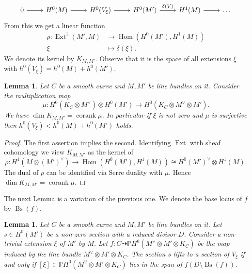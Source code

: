 \documentclass[12pt]{extarticle}
\newtheorem{lemma}[theorem]{Lemma}
\theoremstyle{definition}
\numberwithin{theorem}{section}
\newcommand{\PP}{\mathbb{P}}
\newcommand{\op}{\operatorname}
\begin{document}
\begin{equation*}
\begin{tikzcd}
	0 & {H^0(M)} & {H^0(V_\xi)} & {H^0(M')} & {H^1(M)} & \ldots
	\arrow[from=1-1, to=1-2]
	\arrow[from=1-2, to=1-3]
	\arrow[from=1-3, to=1-4]
	\arrow["{\delta(V)}", from=1-4, to=1-5]
	\arrow[from=1-5, to=1-6]
\end{tikzcd}
\end{equation*}
From this we get a linear function
\begin{align}
\label{eq:boundary_map}
\rho: \op{Ext}^1(M',M) &\rightarrow \op{Hom}(H^0(M'),H^1(M))\\
\xi &\mapsto \delta(\xi).
\end{align}
We denote its kernel by $K_{M,M'}$. Observe that it is the space of all extensions $\xi$ with $h^0(V_\xi) = h^0(M) + h^0(M')$. 
\begin{lemma}\label{lemma:ext}
Let $C$ be a smooth curve and $M, M' $ be line bundles on it. Consider the multiplication map 
\begin{equation*}
\mu: H^0(K_C \otimes M^\vee) \otimes H^0(M') \rightarrow H^0(K_C \otimes M^\vee \otimes M').
\end{equation*}
We have $\dim K_{M,M'} = \op{corank} \mu$. In particular if $\xi$ is not zero and $\mu$ is surjective then $h^0(V_\xi) < h^0(M) + h^0(M')$ holds. 
\end{lemma}
\begin{proof}
The first assertion implies the second. Identifying $\op{Ext}$ with sheaf cohomology we view $K_{M,M'}$ as the kernel of   
\begin{equation*}
\rho : H^1(M \otimes (M')^\vee) \rightarrow \op{Hom}(H^0(M'), H^1(M)) \cong H^0(M')^\vee \otimes H^1(M).
\end{equation*}
The dual of $\rho$ can be identified via Serre duality with $\mu$. Hence $\dim K_{M,M'} = \op{corank} \mu$.
\end{proof}
The next Lemma is a variation of the previous one. We denote the base locus of $f$ by $\op{Bs}(f)$.
\begin{lemma}\label{lemma:lift_section}
Let $C$ be a smooth curve and $M, M' $ be line bundles on it. Let $s \in H^0(M')$ be a non-zero section with a reduced divisor $D$. Consider a non-trivial extension $\xi$ of $M'$ by $M$. Let $f: C \dashrightarrow \PP H^0(M^\vee \otimes M'\otimes K_C)$ be the map induced by the line bundle $M^\vee \otimes M'\otimes K_C$. The section $s$ lifts to a section of $V_\xi$ if and only if $[\xi] \in \PP H^0(M^\vee\otimes M' \otimes K_C)$ lies in the span of $f(D\setminus \op{Bs}(f))$. 
\end{lemma}
\end{document}

